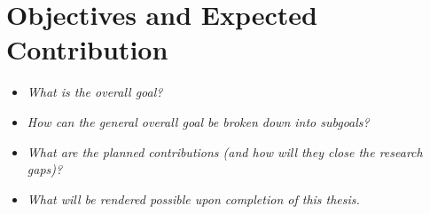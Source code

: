 \section{Objectives and Expected Contribution}
\label{sec:Objectives}

\begin{itemize}	
    \item \emph{What is the overall goal?}
	\item \emph{How can the general overall goal be broken down into subgoals?}
	\item \emph{What are the planned contributions (and how will they close the research gaps)?}
	\item \emph{What will be rendered possible upon completion of this thesis.}
\end{itemize}